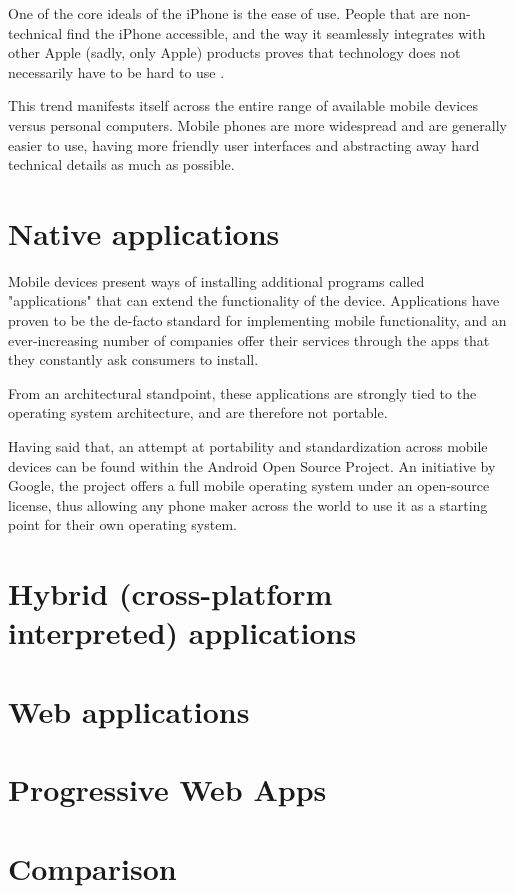 One of the core ideals of the iPhone is the ease of use. People that are non-technical find the iPhone accessible, and the way it seamlessly integrates with other Apple (sadly, only Apple) products proves that technology does not necessarily have to be hard to use \cite{SlashGearIPhoneOverAndroid}.

This trend manifests itself across the entire range of available mobile devices versus personal computers. Mobile phones are more widespread and are generally easier to use, having more friendly user interfaces and abstracting away hard technical details as much as possible.

\section{Native applications}

Mobile devices present ways of installing additional programs called "applications" that can extend the functionality of the device. Applications have proven to be the de-facto standard for implementing mobile functionality, and an ever-increasing number of companies offer their services through the apps that they constantly ask consumers to install.

From an architectural standpoint, these applications are strongly tied to the operating system architecture, and are therefore not portable.

Having said that, an attempt at portability and standardization across mobile devices can be found within the Android Open Source Project. An initiative by Google, the project offers a full mobile operating system under an open-source license, thus allowing any phone maker across the world to use it as a starting point for their own operating system.


\section{Hybrid (cross-platform interpreted) applications}

\section{Web applications}

\section{Progressive Web Apps}

\section{Comparison}